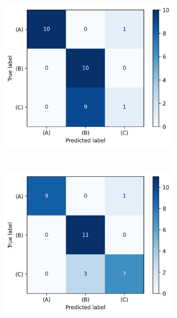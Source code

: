 \documentclass[energies,article,submit,pdftex,moreauthors]{Definitions/mdpi}
\begin{document}
\begin{figure}[t!]
    ~ 
    \begin{subfigure}[t]{0.3\textwidth}
        \centering
        \includegraphics[width=\linewidth]{images/confusion_matrix_multiclass_3}
        \caption{}
    \end{subfigure}
    ~ 
    \begin{subfigure}[t]{0.3\textwidth}
        \centering
        \includegraphics[width=\linewidth]{images/confusion_matrix_multiclass_4}
        \caption{}
    \end{subfigure}
    ~ 

\end{figure}
\end{document}
